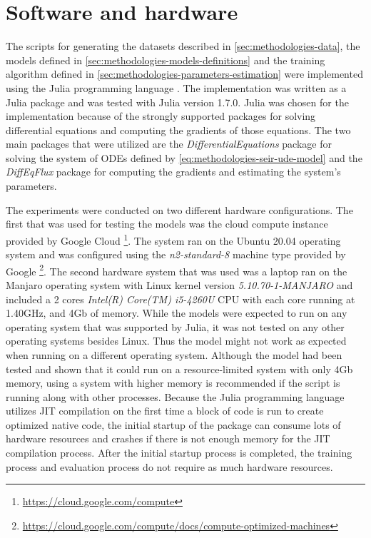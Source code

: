 \section{Software and hardware}

The scripts for generating the datasets described in \autoref{sec:methodologies-data}, the models defined in \autoref{sec:methodologies-models-definitions} and the training algorithm defined in \autoref{sec:methodologies-parameters-estimation} were implemented using the Julia programming language \cite{bezanson2012julia}.
The implementation was written as a Julia package and was tested with Julia version 1.7.0.
Julia was chosen for the implementation because of the strongly supported packages for solving differential equations and computing the gradients of those equations.
The two main packages that were utilized are the \textit{DifferentialEquations} package \cite{rackauckas2017differentialequations} for solving the system of \glspl{ODE} defined by \autoref{eq:methodologies-seir-ude-model} and the \textit{DiffEqFlux} \cite{rackauckasUniversalDifferentialEquations2020} package for computing the gradients and estimating the system's parameters.

The experiments were conducted on two different hardware configurations.
The first that was used for testing the models was the cloud compute instance provided by Google Cloud \footnote{\url{https://cloud.google.com/compute}}.
The system ran on the Ubuntu 20.04 operating system and was configured using the \textit{n2-standard-8} machine type provided by Google \footnote{\url{https://cloud.google.com/compute/docs/compute-optimized-machines}}.
The second hardware system that was used was a laptop ran on the Manjaro operating system with Linux kernel version \textit{5.10.70-1-MANJARO} and included a 2 cores \textit{Intel(R) Core(TM) i5-4260U} CPU with each core running at 1.40GHz, and 4Gb of memory.
While the models were expected to run on any operating system that was supported by Julia, it was not tested on any other operating systems besides Linux.
Thus the model might not work as expected when running on a different operating system.
Although the model had been tested and shown that it could run on a resource-limited system with only 4Gb memory, using a system with higher memory is recommended if the script is running along with other processes.
Because the Julia programming language utilizes \gls{JIT} compilation on the first time a block of code is run to create optimized native code, the initial startup of the package can consume lots of hardware resources and crashes if there is not enough memory for the \gls{JIT} compilation process.
After the initial startup process is completed, the training process and evaluation process do not require as much hardware resources.

